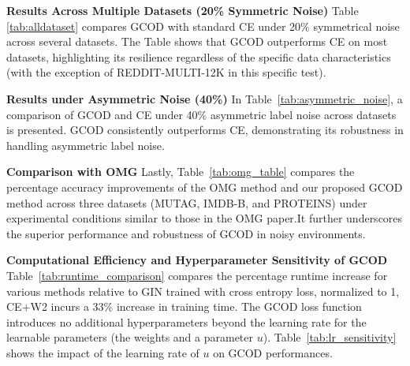 \textbf{Results Across Multiple Datasets (20\% Symmetric Noise)}
Table \ref{tab:alldataset} compares {GCOD} with standard CE under 20\% symmetrical noise across several datasets.
 The Table shows that 
{GCOD} outperforms CE on most datasets, highlighting its resilience regardless of the specific data characteristics (with the exception of REDDIT-MULTI-12K in this specific test).

\textbf{Results under Asymmetric Noise (40\%)}
In Table~\ref{tab:asymmetric_noise}, a comparison of {GCOD} and CE under 40\% asymmetric label noise across datasets is presented. {GCOD} consistently outperforms CE, demonstrating its robustness in handling asymmetric label noise.

\textbf{Comparison with OMG}
Lastly, Table~\ref{tab:omg_table} compares the percentage accuracy improvements of the OMG method and our proposed {GCOD} method across three datasets (MUTAG, IMDB-B, and PROTEINS) under experimental conditions similar to those in the OMG paper.It further underscores the superior performance and robustness of {GCOD} in noisy environments.

\textbf{Computational Efficiency and Hyperparameter Sensitivity of GCOD} Table~\ref{tab:runtime_comparison} compares the percentage runtime increase for various methods relative to GIN trained with cross entropy loss, normalized to 1, {CE+W2} incurs a 33\% increase in training time. The GCOD loss function introduces no additional hyperparameters beyond the learning rate for the learnable parameters (the weights and a parameter $u$). Table~\ref{tab:lr_sensitivity} shows the impact of the learning rate of  $u$ on GCOD performances.
